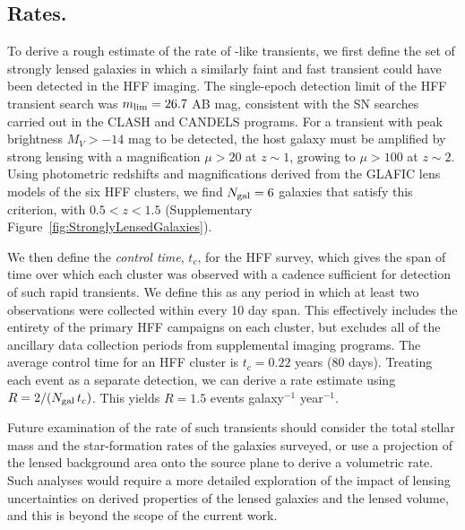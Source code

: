 \subsection{Rates.}\label{sec:RatesMethods}

To derive a rough estimate of the rate of \spock-like transients, we
first define the set of strongly lensed galaxies in which a similarly
faint and fast transient could have been detected in the HFF
imaging. The single-epoch detection limit of the HFF transient search
was $m_{\rm lim}=26.7$ AB mag, consistent with the SN searches carried
out in the CLASH and CANDELS programs\cite{Graur:2014,Rodney:2014}.
For a transient with peak brightness $M_{V}>-14$ mag to be detected,
the host galaxy must be amplified by strong lensing with a
magnification $\mu>20$ at $z\sim1$, growing to $\mu>100$ at $z\sim2$.
Using photometric redshifts and magnifications derived from the GLAFIC
lens models of the six HFF clusters, we find $N_{\rm gal}=6$ galaxies
that satisfy this criterion, with $0.5<z<1.5$ (Supplementary
Figure~\ref{fig:StronglyLensedGalaxies}).

We then define the {\it control time}, $t_{c}$, for the HFF survey,
which gives the span of time over which each cluster was observed with
a cadence sufficient for detection of such rapid transients.  We
define this as any period in which at least two \HST observations were
collected within every 10 day span. This effectively includes the
entirety of the primary HFF campaigns on each cluster, but excludes
all of the ancillary data collection periods from supplemental \HST
imaging programs. The average control time for an HFF cluster is
$t_{c} = 0.22$ years (80 days).  Treating each \spock event as a
separate detection, we can derive a rate estimate using $R = 2 /
(N_{\rm gal}\,t_c)$.  This yields $R=1.5$ events galaxy$^{-1}$
year$^{-1}$.   

Future examination of the rate of such transients should consider the
total stellar mass and the star-formation rates of the galaxies
surveyed, or use a projection of the lensed background area onto the
source plane to derive a volumetric rate.  Such analyses would require
a more detailed exploration of the impact of lensing uncertainties on
derived properties of the lensed galaxies and the lensed volume, and
this is beyond the scope of the current work.

